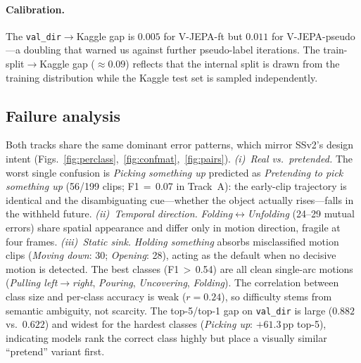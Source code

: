 \documentclass[10pt,twocolumn,letterpaper]{article}
\begin{document}
\paragraph{Calibration.}
The \texttt{val\_dir}$\rightarrow$Kaggle gap is $0.005$ for V-JEPA-ft but $0.011$
for V-JEPA-pseudo---a doubling that warned us against further pseudo-label
iterations. The train-split$\rightarrow$Kaggle gap (${\approx}0.09$) reflects
that the internal split is drawn from the training distribution while the Kaggle
test set is sampled independently.

\subsection{Failure analysis}
\label{sec:failure}
Both tracks share the same dominant error patterns, which mirror SSv2's design
intent (Figs.~\ref{fig:perclass},~\ref{fig:confmat},~\ref{fig:pairs}).
\emph{(i)~Real vs.\ pretended.} The worst single confusion is \emph{Picking
something up} predicted as \emph{Pretending to pick something up} (56/199 clips;
F1\,$=$\,0.07 in Track~A): the early-clip trajectory is identical and the
disambiguating cue---whether the object actually rises---falls in the withheld
future. \emph{(ii)~Temporal direction.} \emph{Folding}$\leftrightarrow$\emph{Unfolding}
(24--29 mutual errors) share spatial appearance and differ only in motion
direction, fragile at four frames. \emph{(iii)~Static sink.} \emph{Holding
something} absorbs misclassified motion clips (\emph{Moving down}: 30;
\emph{Opening}: 28), acting as the default when no decisive motion is detected.
The best classes (F1\,$>$\,0.54) are all clean single-arc motions
(\emph{Pulling left$\rightarrow$right}, \emph{Pouring}, \emph{Uncovering},
\emph{Folding}). The correlation between class size and per-class accuracy is
weak ($r{=}0.24$), so difficulty stems from semantic ambiguity, not scarcity.
The top-5/top-1 gap on \texttt{val\_dir} is large ($0.882$ vs.\ $0.622$) and
widest for the hardest classes (\emph{Picking up}: $+61.3$\,pp top-5), indicating
models rank the correct class highly but place a visually similar ``pretend''
variant first.
\end{document}
